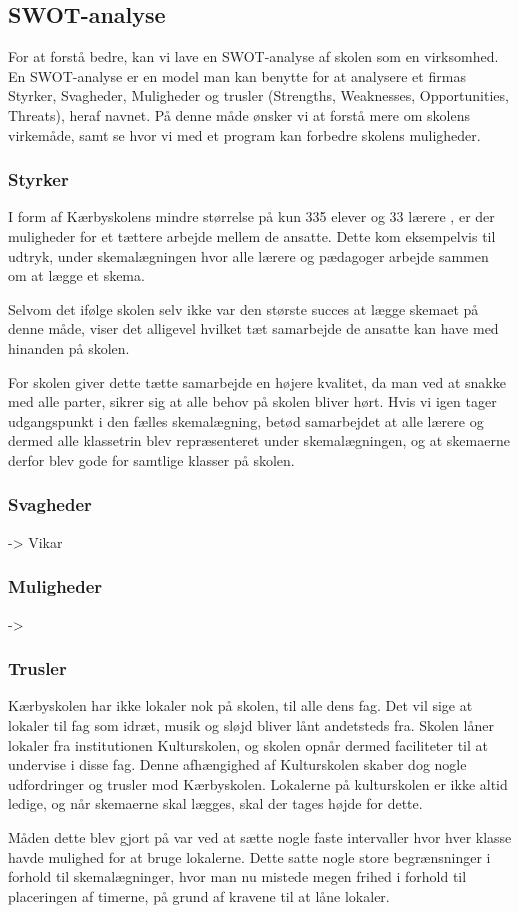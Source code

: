 \subsection{SWOT-analyse}
For at forstå \school bedre, kan vi lave en SWOT-analyse af skolen som en virksomhed. En SWOT-analyse er en model man kan benytte for at analysere et firmas Styrker, Svagheder, Muligheder og trusler (Strengths, Weaknesses, Opportunities, Threats), heraf navnet. På denne måde ønsker vi at forstå mere om skolens virkemåde, samt se hvor vi med et program kan forbedre skolens muligheder.

\subsubsection*{Styrker}
I form af Kærbyskolens mindre størrelse på kun 335 elever og 33 lærere \cite{Kaerbyskolens-laerere}, er der muligheder for et tættere arbejde mellem de ansatte. Dette kom eksempelvis til udtryk, under skemalægningen hvor alle lærere og pædagoger arbejde sammen om at lægge et skema.

Selvom det ifølge skolen selv ikke var den største succes at lægge skemaet på denne måde, viser det alligevel hvilket tæt samarbejde de ansatte kan have med hinanden på skolen.

For skolen giver dette tætte samarbejde en højere kvalitet, da man ved at snakke med alle parter, sikrer sig at alle behov på skolen bliver hørt. Hvis vi igen tager udgangspunkt i den fælles skemalægning, betød samarbejdet at alle lærere og dermed alle klassetrin blev repræsenteret under skemalægningen, og at skemaerne derfor blev gode for samtlige klasser på skolen. 

\subsubsection*{Svagheder}
    -> Vikar 

\subsubsection*{Muligheder}
	-> 

\subsubsection*{Trusler}
Kærbyskolen har ikke lokaler nok på skolen, til alle dens fag. Det vil sige at lokaler til fag som idræt, musik og sløjd bliver lånt andetsteds fra. Skolen låner lokaler fra institutionen Kulturskolen, og skolen opnår dermed faciliteter til at undervise i disse fag. Denne afhængighed af Kulturskolen skaber dog nogle udfordringer og trusler mod Kærbyskolen. Lokalerne på kulturskolen er ikke altid ledige, og når skemaerne skal lægges, skal der tages højde for dette. 

Måden dette blev gjort på var ved at sætte nogle faste intervaller hvor hver klasse havde mulighed for at bruge lokalerne. Dette satte nogle store begrænsninger i forhold til skemalægninger, hvor man nu mistede megen frihed i forhold til placeringen af timerne, på grund af kravene til at låne lokaler. 